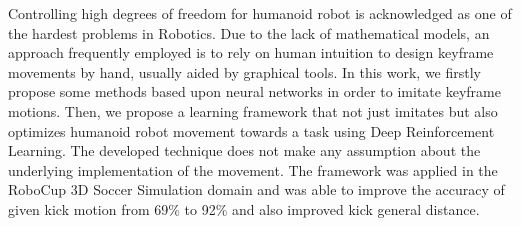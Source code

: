 Controlling high degrees of freedom for humanoid robot is acknowledged as one of the hardest problems in Robotics. Due to the lack of mathematical models, an approach frequently employed is to rely on human intuition to design keyframe movements by hand, usually aided by graphical tools. In this work, we firstly propose some methods based upon neural networks in order to imitate keyframe motions. Then, we  propose a learning framework that not just imitates but also optimizes humanoid robot movement towards a task using Deep Reinforcement Learning. The developed technique does not make any assumption about the underlying implementation of the movement. The framework was applied in the RoboCup 3D Soccer Simulation domain and was able to improve the accuracy of given kick motion from 69\% to 92\% and also improved kick general distance.